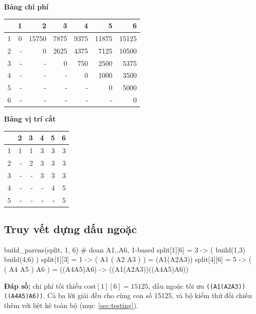 \documentclass[12pt,a4paper]{article}
\begin{document}
\begin{table}[H]
\centering\small
\begin{minipage}{0.52\textwidth}
\centering
\textbf{Bảng chi phí}\\[2pt]
\begin{tabular}{c|rrrrrr}
 & 1 & 2 & 3 & 4 & 5 & 6 \\
\hline
1 & 0 & 15750 & 7875 & 9375 & 11875 & 15125 \\
2 & - & 0 & 2625 & 4375 & 7125 & 10500 \\
3 & - & - & 0 & 750 & 2500 & 5375 \\
4 & - & - & - & 0 & 1000 & 3500 \\
5 & - & - & - & - & 0 & 5000 \\
6 & - & - & - & - & - & 0 \\
\end{tabular}
\end{minipage}\hfill
\begin{minipage}{0.45\textwidth}
\centering
\textbf{Bảng vị trí cắt}\\[2pt]
\begin{tabular}{c|rrrrr}
 & 2 & 3 & 4 & 5 & 6 \\
\hline
1 & 1 & 1 & 3 & 3 & 3 \\
2 & - & 2 & 3 & 3 & 3 \\
3 & - & - & 3 & 3 & 3 \\
4 & - & - & - & 4 & 5 \\
5 & - & - & - & - & 5 \\
\end{tabular}
\end{minipage}
\end{table}

\subsection{Truy vết dựng dấu ngoặc}
\begin{VOutput}
build_parens(split, 1, 6)           # doan A1..A6, 1-based
  split[1][6] = 3 -> ( build(1,3) build(4,6) )
    split[1][3] = 1 -> ( A1  ( A2 A3 ) )  = (A1(A2A3))
    split[4][6] = 5 -> ( ( A4 A5 ) A6 )   = ((A4A5)A6)
  -> ((A1(A2A3))((A4A5)A6))
\end{VOutput}

\textbf{Đáp số:} chi phí tối thiểu $\mathrm{cost}[1][6] = 15125$, dấu ngoặc tối ưu \texttt{((A1(A2A3))((A4A5)A6))}. Cả ba lời giải đều cho cùng con số 15125, và bộ kiểm thử đối chiếu thêm với liệt kê toàn bộ (mục~\ref{sec:testing}).
\end{document}
